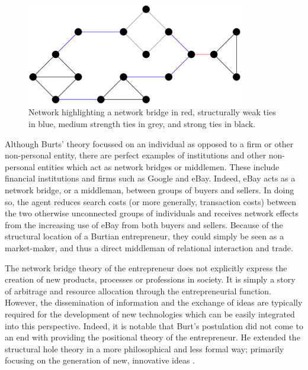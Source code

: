 \begin{figure}[h!]
\centering
\includegraphics[width=0.85\textwidth]{imgs/networkbridge.png}
\caption[Strong ties, weak ties, and network bridges]{Network highlighting a network bridge in red, structurally weak ties in blue, medium strength ties in grey, and strong ties in black.}
\label{fig:networkbridge}
\end{figure}

Although Burts' theory focussed on an individual as opposed to a firm or other non-personal entity, there are perfect examples of institutions and other non-personal entities which act as network bridges or middlemen. These include financial institutions and firms such as Google and eBay. Indeed, eBay acts as a network bridge, or a middleman, between groups of buyers and sellers. In doing so, the agent reduces search costs (or more generally, transaction costs) between the two otherwise unconnected groups of individuals and receives network effects from the increasing use of eBay from both buyers and sellers. Because of the structural location of a Burtian entrepreneur, they could simply be seen as a market-maker, and thus a direct middleman of relational interaction and trade.

The network bridge theory of the entrepreneur does not explicitly express the creation of new products, processes or professions in society. It is simply a story of arbitrage and resource allocation through the entrepreneurial function. However, the dissemination of information and the exchange of ideas are typically required for the development of new technologies which can be easily integrated into this perspective. Indeed, it is notable that Burt's postulation did not come to an end with providing the positional theory of the entrepreneur. He extended the structural hole theory in a more philosophical and less formal way; primarily focusing on the generation of new, innovative ideas \citep{Burt2004}.

